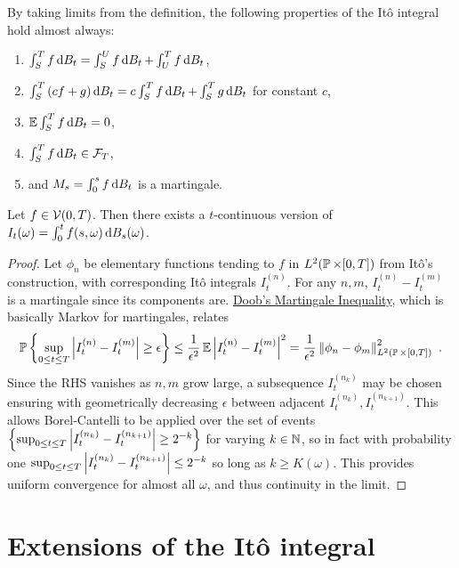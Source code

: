 \documentclass{article}
\begin{document}
By taking limits from the definition, the following properties of the It\^{o} integral hold almost always:

\begin{enumerate}
\item \(\int_S^Tf\d{B_t}=\int_S^Uf\d{B_t}+\int_U^Tf\d{B_t}\),
\item \(\int_S^T \pa{cf+g}\d{B_t}=c\int_S^Tf\d{B_t}+\int_S^Tg\d{B_t}\) for constant \(c\),
\item \(\E \int_S^Tf\d{B_t} =0\),
\item \(\int_S^Tf\d{B_t} \in\mcF_T\),
\item and \(M_s=\int_0^s f\d{B_t}\) is a martingale.
\end{enumerate}

\begin{theorem}
  Let \(f\in\mcV(0, T)\). Then there exists a \(t\)-continuous version of \(I_t(\omega)=\int_0^tf(s, \omega)\d{B_s(\omega)}\).
\end{theorem}
\begin{proof}
  Let \(\phi_n\) be elementary functions tending to \(f\) in \(L^2(\P \times [0, T])\) from It\^{o}'s construction, with corresponding It\^{o} integrals \(I_t^{(n)}\). For any \(n,m\), \(I_t^{(n)}-I_t^{(m)}\) is a martingale since its components are. \href{https://math.ucsd.edu/~pfitz/downloads/courses/winter05/math280b/doob.pdf}{Doob's Martingale Inequality}, which is basically Markov for martingales, relates
  \[
    \P\ca{\sup_{0\le t\le T}\abs{I_t^{(n)}-I_t^{(m)}}\ge \epsilon}\le\frac{1}{\epsilon^2}\E\abs{I_t^{(n)}-I_t^{(m)}}^2=\frac{1}{\epsilon^2}\norm{\phi_n-\phi_m}_{L^2(\P\times[0,T])}^2\,\,.
  \]
  Since the RHS vanishes as \(n,m\) grow large, a subsequence \(I_t^{(n_k)}\) may be chosen ensuring with geometrically decreasing \(\epsilon\) between adjacent \(I_t^{(n_k)},I_t^{(n_{k+1})}\). This allows Borel-Cantelli to be applied over the set of events \(\ca{\sup_{0\le t\le T}\abs{I_t^{(n_k)}-I_t^{(n_{k+1})}}\ge 2^{-k}}\) for varying \(k\in\N\), so in fact with probability one \(\sup_{0\le t\le T}\abs{I_t^{(n_k)}-I_t^{(n_{k+1})}}\le 2^{-k}\) so long as \(k\ge K(\omega)\). This provides uniform convergence for almost all \(\omega\), and thus continuity in the limit.
  \end{proof}

\section{Extensions of the It\^{o} integral}
\end{document}
